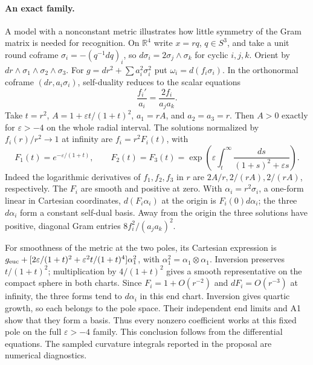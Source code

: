 \documentclass[11pt,letterpaper]{article}
\numberwithin{equation}{section}
\begin{document}
\paragraph{An exact family.}
A model with a nonconstant metric illustrates how little symmetry of the
Gram matrix is needed for recognition. On \(\mathbb R^4\) write \(x=rq\),
\(q\in S^3\), and take a unit round coframe
\(\sigma_i=-(q^{-1}dq)_i\), so \(d\sigma_i=2\sigma_j\wedge\sigma_k\)
for cyclic \(i,j,k\). Orient by \(dr\wedge\sigma_1\wedge\sigma_2
\wedge\sigma_3\). For \(g=dr^2+\sum a_i^2\sigma_i^2\) put
\(\omega_i=d(f_i\sigma_i)\). In the orthonormal coframe
\((dr,a_i\sigma_i)\), self-duality reduces to the scalar equations
\[
       \frac{f_i'}{a_i}=\frac{2f_i}{a_j a_k}.
\]
Take \(t=r^2\), \(A=1+\varepsilon t/(1+t)^2\), \(a_1=rA\), and
\(a_2=a_3=r\). Then \(A>0\) exactly for \(\varepsilon>-4\) on the
whole radial interval. The solutions normalized by
\(f_i(r)/r^2\to1\) at infinity are \(f_i=r^2F_i(t)\), with
\[
 F_1(t)=e^{-\varepsilon/(1+t)},\qquad
 F_2(t)=F_3(t)=
 \exp\!\left(\varepsilon\int_t^\infty
          \frac{ds}{(1+s)^2+\varepsilon s}\right).
\]
Indeed the logarithmic derivatives of \(f_1,f_2,f_3\) in \(r\)
are \(2A/r,2/(rA),2/(rA)\), respectively. The \(F_i\) are smooth
and positive at zero. With \(\alpha_i=r^2\sigma_i\), a one-form
linear in Cartesian coordinates, \(d(F_i\alpha_i)\) at the origin
is \(F_i(0)d\alpha_i\); the three \(d\alpha_i\) form a constant
self-dual basis. Away from the origin the three solutions have
positive, diagonal Gram entries \(8f_i^2/(a_j a_k)^2\).

For smoothness of the metric at the two poles, its Cartesian expression
is \(g_{\rm euc}+[2\varepsilon/(1+t)^2+
\varepsilon^2 t/(1+t)^4]\alpha_1^2\), with
\(\alpha_1^2=\alpha_1\otimes\alpha_1\). Inversion preserves
\(t/(1+t)^2\); multiplication by \(4/(1+t)^2\) gives a smooth
representative on the compact sphere in both charts.
Since \(F_i=1+O(r^{-2})\) and \(dF_i=O(r^{-3})\) at infinity, the
three forms tend to \(d\alpha_i\) in this end chart. Inversion gives
quartic growth, so each belongs to the pole space. Their independent
end limits and A1 show that they form a basis. Thus every nonzero coefficient works at this fixed
pole on the full \(\varepsilon>-4\) family. This conclusion follows
from the differential equations. The sampled curvature integrals
reported in the proposal \cite{Baker2026PoleFormsProposal} are
numerical diagnostics.
\end{document}

